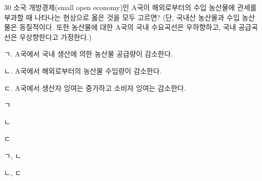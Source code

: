 \begin{question}{30}
소국 개방경제(small open economy)인 A국이 해외로부터의 수입 농산물에 관세를 부과할 때 나타나는 현상으로 옳은 것을 모두 고르면? (단, 국내산 농산물과 수입 농산물은 동질적이다. 또한 농산물에 대한 A국의 국내 수요곡선은 우하향하고, 국내 공급곡선은 우상향한다고 가정한다.)
\begin{framedtext}
ㄱ. A국에서 국내 생산에 의한 농산물 공급량이 감소한다. \par
ㄴ. A국에서 해외로부터의 농산물 수입량이 감소한다. \par
ㄷ. A국에서 생산자 잉여는 증가하고 소비자 잉여는 감소한다. \par
\end{framedtext}
\begin{choices}
  \item ㄱ
  \item ㄴ
  \item ㄷ
  \item ㄱ, ㄴ
  \item ㄴ, ㄷ
\end{choices}
\end{question}
